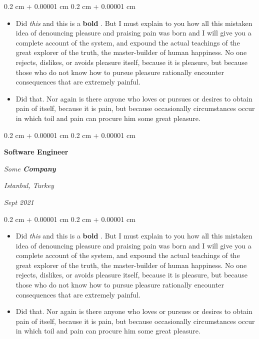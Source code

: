 \documentclass[10pt, letterpaper]{article}
\newenvironment{highlights}{
    \begin{itemize}[
        topsep=0.10 cm,
        parsep=0.10 cm,
        partopsep=0pt,
        itemsep=0pt,
        leftmargin=0.4 cm + 10pt
    ]
}{
    \end{itemize}
} %
\newenvironment{onecolentry}{
    \begin{adjustwidth}{
        0.2 cm + 0.00001 cm
    }{
        0.2 cm + 0.00001 cm
    }
}{
    \end{adjustwidth}
} %
\newenvironment{twocolentry}[2][]{
    \onecolentry
    \def\secondColumn{#2}
    \setcolumnwidth{\fill, 4.5 cm}
    \begin{paracol}{2}
}{
    \switchcolumn \raggedleft \secondColumn
    \end{paracol}
    \endonecolentry
} %
\let\hrefWithoutArrow\href
\renewcommand{\href}[2]{\hrefWithoutArrow{#1}{\ifthenelse{\equal{#2}{}}{ }{#2 }\raisebox{.15ex}{\footnotesize \faExternalLink*}}}
\begin{document}
        \vspace{0.10 cm}
        \begin{onecolentry}
            \begin{highlights}
                \item Did \textit{this} and this is a \textbf{bold} \href{https://example.com}{link}. But I must explain to you how all this mistaken idea of denouncing pleasure and praising pain was born and I will give you a complete account of the system, and expound the actual teachings of the great explorer of the truth, the master-builder of human happiness. No one rejects, dislikes, or avoids pleasure itself, because it is pleasure, but because those who do not know how to pursue pleasure rationally encounter consequences that are extremely painful.
                \item Did that. Nor again is there anyone who loves or pursues or desires to obtain pain of itself, because it is pain, but because occasionally circumstances occur in which toil and pain can procure him some great pleasure.
            \end{highlights}
        \end{onecolentry}


        \vspace{0.2 cm}

        \begin{twocolentry}{
        \textit{Istanbul, Turkey}    
            
        \textit{Sept 2021}}
            \textbf{Software Engineer}
            
            \textit{Some \textbf{Company}}
        \end{twocolentry}

        \vspace{0.10 cm}
        \begin{onecolentry}
            \begin{highlights}
                \item Did \textit{this} and this is a \textbf{bold} \href{https://example.com}{link}. But I must explain to you how all this mistaken idea of denouncing pleasure and praising pain was born and I will give you a complete account of the system, and expound the actual teachings of the great explorer of the truth, the master-builder of human happiness. No one rejects, dislikes, or avoids pleasure itself, because it is pleasure, but because those who do not know how to pursue pleasure rationally encounter consequences that are extremely painful.
                \item Did that. Nor again is there anyone who loves or pursues or desires to obtain pain of itself, because it is pain, but because occasionally circumstances occur in which toil and pain can procure him some great pleasure.
            \end{highlights}
        \end{onecolentry}
\end{document}
